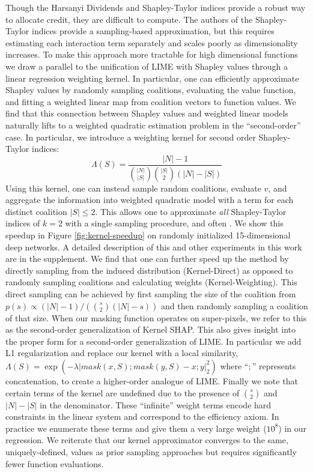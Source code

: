 \documentclass{article} %
\begin{document}
 Though the Harsanyi Dividends and Shapley-Taylor indices provide a robust way to allocate credit, they are difficult to compute. The authors of the Shapley-Taylor indices provide a sampling-based approximation, but this requires estimating each interaction term separately and scales poorly as dimensionality increases. To make this approach more tractable for high dimensional functions we draw a parallel to the unification of LIME with Shapley values through a linear regression weighting kernel. In particular, one can efficiently approximate Shapley values by randomly sampling coalitions, evaluating the value function, and fitting a weighted linear map from coalition vectors to function values. We find that this connection between Shapley values and weighted linear models naturally lifts to a weighted quadratic estimation problem in the ``second-order'' case. In particular, we introduce a weighting kernel for second order Shapley-Taylor indices:
\vspace{-.05in}
\begin{equation}
    \Lambda(S) = \frac{|N| -1}{\binom{|N|}{|S|} \binom{|S|}{2} (|N|-|S|)}
\end{equation}
Using this kernel, one can instead sample random coalitions, evaluate $v$, and aggregate the information into weighted quadratic model with a term for each distinct coalition $|S| \leq 2$. This allows one to approximate \textit{all} Shapley-Taylor indices of $k=2$ with a single sampling procedure, and often . We show this speedup in Figure \ref{fig:kernel-speedup} on randomly initialized 15-dimensional deep networks. A detailed description of this and other experiments in this work are in the supplement. We find that one can further speed up the method by directly sampling from the induced distribution (Kernel-Direct) as opposed to randomly sampling coalitions and calculating weights (Kernel-Weighting). This direct sampling can be achieved by first sampling the size of the coalition from $p(s) \propto (|N| -1)/(\binom{s}{2} (|N|-s))$ and then randomly sampling a coalition of that size. When our masking function operates on super-pixels, we refer to this as the second-order generalization of Kernel SHAP. This also gives insight into the proper form for a second-order generalization of LIME. In particular we add L1 regularization \citep{tibshirani1996regression} and replace our kernel with a local similarity, $\Lambda(S) = \exp(-\lambda|mask(x,S);mask(y,S) -x;y|_2^2)$ where ``$;$'' represents concatenation, to create a higher-order analogue of LIME. Finally we note that certain terms of the kernel are undefined due to the presence of $\binom{s}{2}$ and $|N| - |S|$ in the denominator. These ``infinite'' weight terms encode hard constraints in the linear system and correspond to the efficiency axiom. In practice we enumerate these terms and give them a very large weight ($10^8$) in our regression. We reiterate that our kernel approximator converges to the same, uniquely-defined, values as prior sampling approaches but requires significantly fewer function evaluations. 
\end{document}
